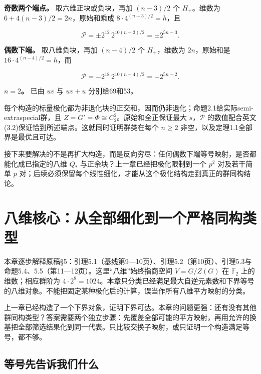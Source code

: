 \documentclass[UTF8,fontset=fandol,zihao=-4,openany,oneside]{ctexbook}
\begin{document}
\textbf{奇数两个端点。} 取六维正块或负块，再加 \((n-3)/2\) 个 \(H_+\)。维数为 \(6+4(n-3)/2=2n\)，原始和乘成 \(8\cdot4^{(n-3)/2}=h\)，且



\[
\mathcal P=\pm2^{12}\,2^{10(n-3)/2}=\pm2^{5n-3}.
\]



\textbf{偶数下端。} 取八维负块，再加 \((n-4)/2\) 个 \(H_+\)，维数为 \(2n\)，原始和是 \(16\cdot4^{(n-4)/2}=h\)，而



\[
\mathcal P=-2^{18}\,2^{10(n-4)/2}=-2^{5n-2}.
\]



\textbf{\(n=2\)。} 已由 \(uv\) 与 \(uv+u\) 分别给69和53。



每个构造的标量极化都为非退化块的正交和，因而仍非退化；命题2.1给实际semi-extraspecial群，且 \(Z=G'=\Phi\cong C_2^2\)。原始和全正保证最大 \(s\)，\(\mathcal P\) 的数值配合英文(3.2)保证恰到所述端点。这就同时证明群类在每个 \(n\ge2\) 非空，以及定理1.1全部界是最优且可达。



接下来要解决的不是再扩大构造，而是反向穷尽：任何偶数下端等号映射，是否都能化成已指定的八维 \(Q_*\) 与正余块？上一章已经把极化限制到一个 \(p^2\) 对及若干简单 \(p\) 对；后续必须保留每个线性细化，才能从这个极化结构走到真正的群同构结论。



\chapter{八维核心：从全部细化到一个严格同构类型}


本章逐步解释原稿§5：引理5.1（基线第9—10页）、引理5.2（第10页）、引理5.3与命题5.4、5.5（第11—12页）。这里“八维”始终指商空间 \(V=G/Z(G)\) 在 \(\mathbb F_2\) 上的维数；相应群阶为 \(4\cdot2^8=1024\)。本章只分类已经满足最大自逆元素数和下界等号的八维对象。不能把固定某种极化后的计算，误当作所有八维平方映射的分类。



上一章已经构造了一个下界对象，证明下界可达。本章的问题更强：还有没有其他群同构类型？答案需要两个独立步骤：先覆盖全部可能的平方映射，再用允许的换基把全部筛选结果化到同一代表。只比较交换子映射，或只证明一个构造满足等号，都不够。



\section{等号先告诉我们什么}
\end{document}
